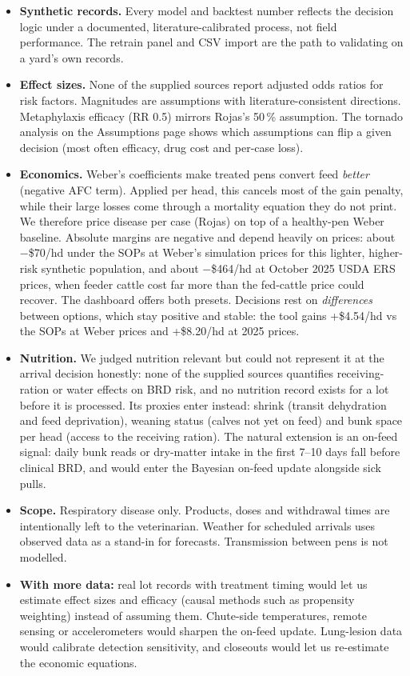 \documentclass[10pt,letterpaper]{article}
\newcommand{\pct}{\,\%}
\newcommand{\usd}[1]{\$#1}
\begin{document}
\begin{itemize}
  \item \textbf{Synthetic records.} Every model and backtest number reflects the decision logic under a documented, literature-calibrated process, not field performance. The retrain panel and CSV import are the path to validating on a yard's own records.
  \item \textbf{Effect sizes.} None of the supplied sources report adjusted odds ratios for risk factors. Magnitudes are assumptions with literature-consistent directions. Metaphylaxis efficacy (RR 0.5) mirrors Rojas's 50\pct{} assumption. The tornado analysis on the Assumptions page shows which assumptions can flip a given decision (most often efficacy, drug cost and per-case loss).
  \item \textbf{Economics.} Weber's coefficients make treated pens convert feed \emph{better} (negative AFC term). Applied per head, this cancels most of the gain penalty, while their large losses come through a mortality equation they do not print. We therefore price disease per case (Rojas) on top of a healthy-pen Weber baseline. Absolute margins are negative and depend heavily on prices: about $-$\usd{70}/hd under the SOPs at Weber's simulation prices for this lighter, higher-risk synthetic population, and about $-$\usd{464}/hd at October 2025 USDA ERS prices, when feeder cattle cost far more than the fed-cattle price could recover. The dashboard offers both presets. Decisions rest on \emph{differences} between options, which stay positive and stable: the tool gains +\usd{4.54}/hd vs the SOPs at Weber prices and +\usd{8.20}/hd at 2025 prices.
  \item \textbf{Nutrition.} We judged nutrition relevant but could not represent it at the arrival decision honestly: none of the supplied sources quantifies receiving-ration or water effects on BRD risk, and no nutrition record exists for a lot before it is processed. Its proxies enter instead: shrink (transit dehydration and feed deprivation), weaning status (calves not yet on feed) and bunk space per head (access to the receiving ration). The natural extension is an on-feed signal: daily bunk reads or dry-matter intake in the first 7--10 days fall before clinical BRD, and would enter the Bayesian on-feed update alongside sick pulls.
  \item \textbf{Scope.} Respiratory disease only. Products, doses and withdrawal times are intentionally left to the veterinarian. Weather for scheduled arrivals uses observed data as a stand-in for forecasts. Transmission between pens is not modelled.
  \item \textbf{With more data:} real lot records with treatment timing would let us estimate effect sizes and efficacy (causal methods such as propensity weighting) instead of assuming them. Chute-side temperatures, remote sensing or accelerometers would sharpen the on-feed update. Lung-lesion data would calibrate detection sensitivity, and closeouts would let us re-estimate the economic equations.
\end{itemize}
\end{document}
